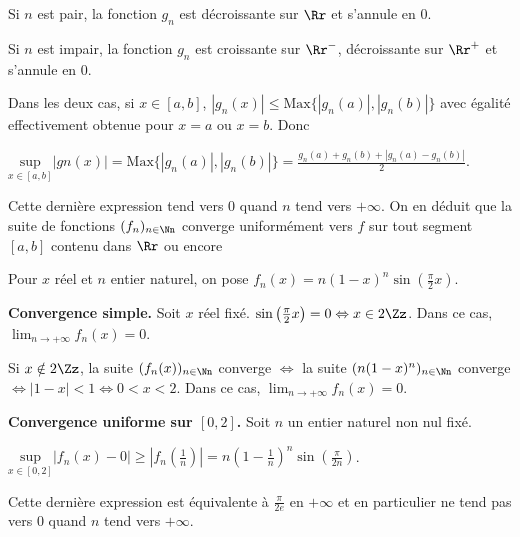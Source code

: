 {{Si $n$ est pair, la fonction $g_n$ est décroissante sur $\Rr$ et s'annule en $0$.

Si $n$ est impair, la fonction $g_n$ est croissante sur $\Rr^-$, décroissante sur $\Rr^+$ et s'annule en $0$.

Dans les deux cas, si $x\in[a,b]$, $|g_n(x)|\leqslant\text{Max}\{|g_n(a)|,|g_n(b)|\}$ avec égalité effectivement obtenue pour $x=a$ ou $x=b$. Donc 

\begin{center}
$\underset{x\in[a,b]}{\text{sup}}|gn(x)|=\text{Max}\{|g_n(a)|,|g_n(b)|\}=\frac{g_n(a)+g_n(b)+|g_n(a)-g_n(b)|}{2}$.
\end{center}

Cette dernière expression tend vers $0$ quand $n$ tend vers $+\infty$. On en déduit que la suite de fonctions $(f_n)_{n\in\Nn}$ converge uniformément vers $f$ sur tout segment $[a,b]$ contenu dans $\Rr$ ou encore 

\begin{center}
\end{center}
Pour $x$ réel et $n$ entier naturel, on pose $f_n(x) =n(1-x)^n\sin\left(\frac{\pi}{2}x\right)$.

\textbf{Convergence simple.} Soit $x$ réel fixé. $\sin\left(\frac{\pi}{2}x\right)=0\Leftrightarrow x\in 2\Zz$. Dans ce cas, $\lim_{n \rightarrow +\infty}f_n(x) =0$.

Si $x\notin 2\Zz$, la suite $(f_n(x))_{n\in\Nn}$ converge $\Leftrightarrow$ la suite $(n(1-x)^n)_{n\in\Nn}$ converge $\Leftrightarrow |1-x| < 1 \Leftrightarrow 0 < x < 2$. Dans ce cas, $\lim_{n \rightarrow +\infty}f_n(x)=0$.

\begin{center}
\end{center}

\textbf{Convergence uniforme sur $[0,2]$.} Soit  $n$ un entier naturel non nul fixé.

\begin{center}
$\underset{x\in[0,2]}{\text{sup}}|f_n(x)-0|\geqslant\left|f_n\left(\frac{1}{n}\right)\right|=n\left(1-\frac{1}{n}\right)^n\sin\left(\frac{\pi}{2n}\right)$.
\end{center}

Cette dernière expression est équivalente à $\frac{\pi}{2e}$ en $+\infty$ et en particulier ne tend pas vers $0$ quand $n$ tend vers $+\infty$. 

}}
